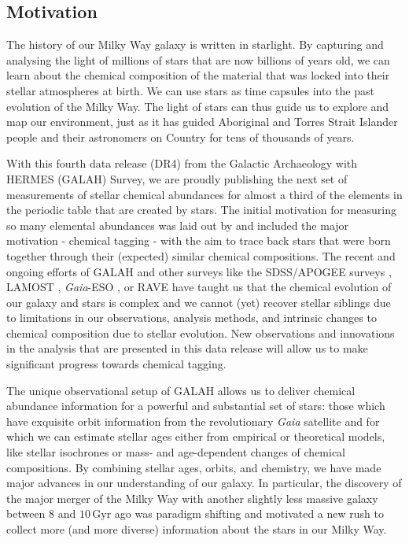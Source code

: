 \documentclass[
  journal=pasa,
  manuscript=research-paper, %
  year=2023,
  volume=37
]{cup-journal}
\newcommand{\Gaia}{\textit{Gaia}\xspace}
\begin{document}
\subsection{Motivation} \label{sec:motivation}

The history of our Milky Way galaxy is written in starlight. By capturing and analysing the light of millions of stars that are now billions of years old, we can learn about the chemical composition of the material that was locked into their stellar atmospheres at birth. We can use stars as time capsules into the past evolution of the Milky Way. The light of stars can thus guide us to explore and map our environment, just as it has guided Aboriginal and Torres Strait Islander people and their astronomers on Country for tens of thousands of years.

With this fourth data release (DR4) from the Galactic Archaeology with HERMES (GALAH) Survey, we are proudly publishing the next set of measurements of stellar chemical abundances for almost a third of the elements in the periodic table that are created by stars. The initial motivation for measuring so many elemental abundances was laid out by \citet{DeSilva2015} and included the major motivation - chemical tagging - with the aim to trace back stars that were born together through their (expected) similar chemical compositions. The recent and ongoing efforts of GALAH and other surveys like the SDSS/APOGEE surveys \citep[e.g.][]{SDSSDR17, Kollmeier2017}, LAMOST \citep{Zhao2012}, \Gaia-ESO \citep{Gilmore2022}, or RAVE \citep{Steinmetz2020a} have taught us that the chemical evolution of our galaxy and stars is complex and we cannot (yet) recover stellar siblings due to limitations in our observations, analysis methods, and intrinsic changes to chemical composition due to stellar evolution. New observations and innovations in the analysis that are presented in this data release will allow us to make significant progress towards chemical tagging.

The unique observational setup of GALAH allows us to deliver chemical abundance information for a powerful and substantial set of stars: those which have exquisite orbit information from the revolutionary \Gaia satellite \citep{Gaia-Collaboration2016} and for which we can estimate stellar ages either from empirical or theoretical models, like stellar isochrones or mass- and age-dependent changes of chemical compositions. By combining stellar ages, orbits, and chemistry, we have made major advances in our understanding of our galaxy. In particular, the discovery of the major merger of the Milky Way with another slightly less massive galaxy between 8 and $10\,\mathrm{Gyr}$ ago \citep{Belokurov2018, Helmi2018} was paradigm shifting and motivated a new rush to collect more (and more diverse) information about the stars in our Milky Way.
\end{document}
